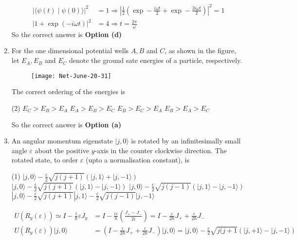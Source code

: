 \begin{enumerate}
\begin{answer}
\begin{align*}
	|\langle\psi(t) \mid \psi(0)\rangle|^{2}&=1 \Rightarrow\left|\frac{1}{2}\left(\exp -\frac{i \omega t}{2}+\exp -\frac{3 i \omega t}{2}\right)\right|^{2}=1 \\
	|1+\exp (-i \omega t)|^{2}&=4 \Rightarrow t=\frac{2 \pi}{\omega}
	\end{align*}
		So the correct answer is \textbf{Option (d)}
\end{answer}
\item  For the one dimensional potential wells $A, B$ and $C$, as shown in the figure, let $E_{A}, E_{B}$ and $E_{C}$ denote the ground sate energies of a particle, respectively.
	\begin{figure}[H]
	\centering
	\texttt{[image: Net-June-20-31]}
\end{figure}	
The correct ordering of the energies is
 \begin{tasks}(2)
	\task[\textbf{a.}] $E_{C}>E_{B}>E_{A}$
	\task[\textbf{b.}]$E_{A}>E_{B}>E_{C}$
	\task[\textbf{c.}]$E_{B}>E_{C}>E_{A}$
	\task[\textbf{d.}] $E_{B}>E_{A}>E_{C}$
\end{tasks}
\begin{answer}
	So the correct answer is \textbf{Option (a)}
\end{answer}
\item  An angular momentum eigenstate $|j, 0\rangle$ is rotated by an infinitesimally small angle $\varepsilon$ about the positive $y$-axis in the counter clockwise direction. The rotated state, to order $\varepsilon$ (upto a normalisation constant), is
 \begin{tasks}(1)
	\task[\textbf{a.}]$|j, 0\rangle-\frac{\varepsilon}{2} \sqrt{j(j+1)}(|j, 1\rangle+|j,-1\rangle)$
	\task[\textbf{b.}] $|j, 0\rangle-\frac{\varepsilon}{2} \sqrt{j(j+1)}(|j, 1\rangle-|j,-1\rangle)$
	\task[\textbf{c.}]$|j, 0\rangle-\frac{\varepsilon}{2} \sqrt{j(j-1)}(|j, 1\rangle-|j,-1\rangle)$
	\task[\textbf{d.}] $|j, 0\rangle-\frac{\varepsilon}{2} \sqrt{j(j+1)}|j, 1\rangle-\frac{\varepsilon}{2} \sqrt{j(j-1)}|j,-1\rangle$	
\end{tasks}
\begin{answer}
	\begin{align*}
	U\left(R_{y}(\varepsilon)\right) \simeq I-\frac{i}{\hbar} \varepsilon J_{y}&=I-\frac{i \varepsilon}{\hbar}\left(\frac{J_{+}-J_{-}}{2 i}\right)=I-\frac{\varepsilon}{2 \hbar} J_{+}+\frac{\varepsilon}{2 \hbar} J_{-}\\
	U\left(R_{y}(\varepsilon)\right)|j, 0\rangle&=\left(I-\frac{\varepsilon}{2 \hbar} J_{+}+\frac{\varepsilon}{2 \hbar} J_{-}\right)|j, 0\rangle=|j, 0\rangle-\frac{\varepsilon}{2} \sqrt{j(j+1}(|j,+1\rangle-|j,-1\rangle)

\end{align*}
\end{answer}
\end{enumerate}
